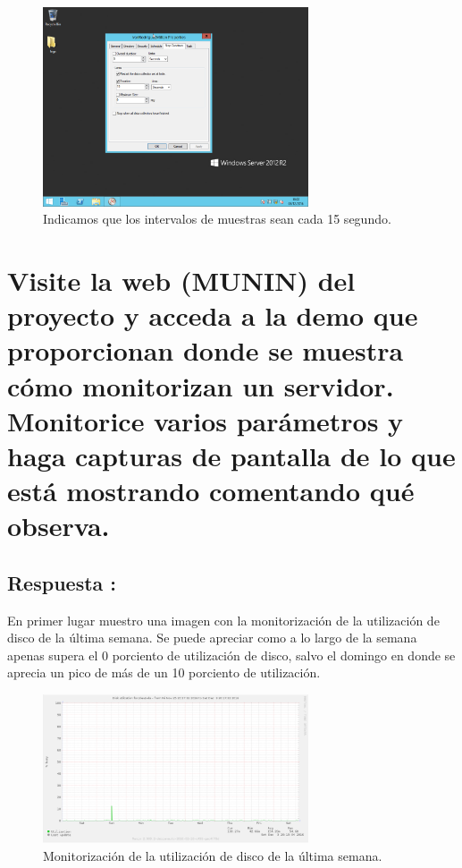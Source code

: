 \begin{figure}[H]
	\begin{center}
		\includegraphics[width=0.7\textwidth]{Imagenes/Limite_reinicio_recopilador}
		\caption{Indicamos que los intervalos de muestras sean cada 15 segundo.} \label{fig:18}
	\end{center}
\end{figure}
\newpage
\section{Visite la web (MUNIN) del proyecto y acceda a la demo que proporcionan donde se muestra cómo monitorizan un servidor. Monitorice varios parámetros y haga capturas de pantalla de lo que está mostrando comentando qué observa.}
\subsection{Respuesta : }

En primer lugar muestro una imagen con la monitorización de la utilización de disco de la última semana. Se puede apreciar como a lo largo de la semana apenas supera el 0 porciento de utilización de disco, salvo el domingo en donde se aprecia un pico de más de un 10 porciento de utilización.

\begin{figure}[H]
	\begin{center}
		\includegraphics[width=0.7\textwidth]{Imagenes/Monitorizacion_utilizacion_disco}
		\caption{Monitorización de la utilización de disco de la última semana.} \label{fig:19}
	\end{center}
\end{figure}

